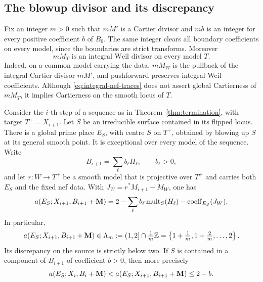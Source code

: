 \subsection{The blowup divisor and its discrepancy}

Fix an integer $m>0$ such that $mM'$ is a Cartier divisor and $mb$ is an
integer for every positive coefficient $b$ of $B_0$.  The same integer
clears all boundary coefficients on every model, since the boundaries are
strict transforms.  Moreover
\begin{equation}
 mM_T\text{ is an integral Weil divisor on every model }T.
 \label{eq:integral-nef-traces}
\end{equation}
Indeed, on a common model carrying the data, $mM_W$ is the pullback of the
integral Cartier divisor $mM'$, and pushforward preserves integral Weil
coefficients.  Although \eqref{eq:integral-nef-traces} does not assert
global Cartierness of $mM_T$, it implies Cartierness on the smooth locus
of $T$.

\begin{proposition}
\label{prop:witnesses}
Consider the $i$-th step of a sequence as in Theorem~\ref{thm:termination}, with target
$T^+=X_{i+1}$.  Let $S$ be an irreducible surface contained in its flipped
locus.  There is a global prime place $E_S$, with centre $S$ on $T^+$,
obtained by blowing up $S$ at its general smooth point.  It is exceptional
over every model of the sequence.  Write
\[
 B_{i+1}=\sum_{\ell} b_{\ell}H_{\ell},
 \qquad b_{\ell}>0,
\]
and let $r\colon W\to T^+$ be a smooth model that is projective over
$T^+$ and carries both $E_S$ and the fixed nef data.  With
$J_W=r^*M_{i+1}-M_W$, one has
\begin{equation}
 a(E_S;X_{i+1},B_{i+1}+\mathbf M)
 =2-\sum_{\ell}b_{\ell}\operatorname{mult}_S(H_{\ell})
       -\operatorname{coeff}_{E_S}(J_W).
 \label{eq:witness-discrepancy}
\end{equation}
In particular,
\begin{equation}
 a(E_S;X_{i+1},B_{i+1}+\mathbf M)
 \in\Lambda_m:=(1,2]\cap\tfrac1m\mathbb Z
 =\left\{1+\tfrac1m,1+\tfrac2m,\ldots,2\right\}.
 \label{eq:witness-grid}
\end{equation}
Its discrepancy on the source is strictly below two.  If $S$ is contained
in a component of $B_{i+1}$ of coefficient $b>0$, then more precisely
\begin{equation}
 a(E_S;X_i,B_i+\mathbf M)
 < a(E_S;X_{i+1},B_{i+1}+\mathbf M)\leq2-b.
 \label{eq:witness-threshold}
\end{equation}
\end{proposition}

